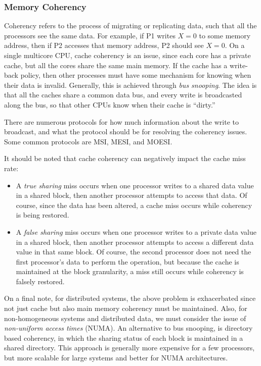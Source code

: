 \documentclass[12pt]{article}
\begin{document}
\subsubsection*{Memory Coherency}

Coherency refers to the process of migrating or replicating data,
such that all the processors see the same data.
For example, if P1 writes $X=0$ to some memory address, then if P2 
accesses that memory address, P2 should see $X=0$.
On a single multicore CPU, cache coherency is an issue, since each core
has a private cache, but all the cores share the same main memory.
If the cache has a write-back policy, then other processes must have some
mechanism for knowing when their data is invalid.
Generally, this is achieved through {\it bus snooping}.
The idea is that all the caches share a common data bus, and every write is
broadcasted along the bus, so that other CPUs know when their cache is 
``dirty.''

There are numerous protocols for how much information about the write to
broadcast, and what the protocol should be for resolving the coherency
issues.
Some common protocols are MSI, MESI, and MOESI.

It should be noted that cache coherency can negatively impact the cache miss 
rate:
\begin{itemize}
\item A {\it true sharing} miss occurs when one processor writes to a shared 
data value in a shared block, then another processor attempts to access that 
data.
Of course, since the data has been altered, a cache miss occurs while coherency
is being restored.
\item A {\it false sharing} miss occurs when one processor writes to a private 
data value in a shared block, then another processor attempts to access a 
different data value in that same block.
Of course, the second processor does not need the first processor's data to
perform the operation, but because the cache is maintained at the block
granularity, a miss still occurs while coherency is falsely restored.
\end{itemize}

On a final note, for distributed systems, the above problem is exhacerbated
since not just cache but also main memory coherency must be maintained.
Also, for non-homogeneous systems and distributed data, we must consider 
the issue of {\it non-uniform access times} (NUMA).
An alternative to bus snooping, is directory based coherency, in which
the sharing status of each block is maintained in a shared directory.
This approach is generally more expensive for a few processors, but more
scalable for large systems and better for NUMA architectures.
\end{document}
